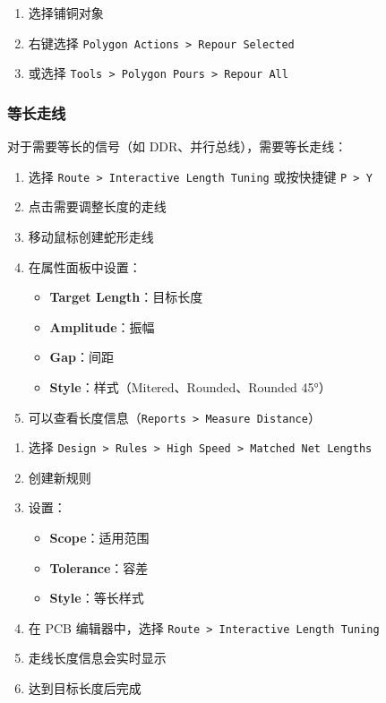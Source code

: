 
\begin{enumerate}
  \item 选择铺铜对象
  \item 右键选择 \lstinline{Polygon Actions > Repour Selected}
  \item 或选择 \lstinline{Tools > Polygon Pours > Repour All}
\end{enumerate}

\subsubsection{等长走线}

对于需要等长的信号（如 DDR、并行总线），需要等长走线：


\begin{enumerate}
  \item 选择 \lstinline{Route > Interactive Length Tuning} 或按快捷键 \lstinline{P > Y}
  \item 点击需要调整长度的走线
  \item 移动鼠标创建蛇形走线
  \item 在属性面板中设置：
    \begin{itemize}
      \item \textbf{Target Length}：目标长度
      \item \textbf{Amplitude}：振幅
      \item \textbf{Gap}：间距
      \item \textbf{Style}：样式（Mitered、Rounded、Rounded 45°）
    \end{itemize}
  \item 可以查看长度信息（\lstinline{Reports > Measure Distance}）
\end{enumerate}


\begin{enumerate}
  \item 选择 \lstinline{Design > Rules > High Speed > Matched Net Lengths}
  \item 创建新规则
  \item 设置：
    \begin{itemize}
      \item \textbf{Scope}：适用范围
      \item \textbf{Tolerance}：容差
      \item \textbf{Style}：等长样式
    \end{itemize}
  \item 在 PCB 编辑器中，选择 \lstinline{Route > Interactive Length Tuning}
  \item 走线长度信息会实时显示
  \item 达到目标长度后完成
\end{enumerate}

